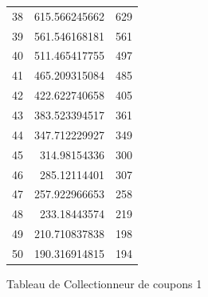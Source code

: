 \documentclass[10pt,a4paper]{article}
\begin{document}
\begin{figure}[h]
\begin{tabular}{|r|r|r|}
38 & 615.566245662 & 629\\
39 & 561.546168181 & 561\\
40 & 511.465417755 & 497\\
41 & 465.209315084 & 485\\
42 & 422.622740658 & 405\\
43 & 383.523394517 & 361\\
44 & 347.712229927 & 349\\
45 & 314.98154336 & 300\\
46 & 285.12114401 & 307\\
47 & 257.922966653 & 258\\
48 & 233.18443574 & 219\\
49 & 210.710837838 & 198\\
50 & 190.316914815 & 194\\
\hline
\end{tabular}
\caption{Tableau de Collectionneur de coupons 1}
\end{figure}
\end{document}
